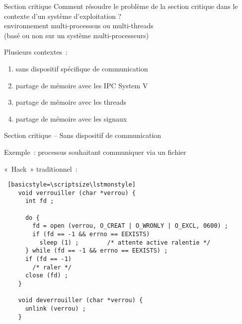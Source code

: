 

\begin {frame} {Section critique}
    Comment résoudre le problème de la section critique dans
    le contexte d'un système d'exploitation ? \\
    \implique environnement multi-processsus ou multi-threads \\
    (basé ou non sur un système multi-processeurs)

    \vspace* {3mm}
    Plusieurs contextes~:
    \begin {enumerate}
	\item sans dispositif spécifique de communication
	\item partage de mémoire avec les IPC System V
	\item partage de mémoire avec les threads
	\item partage de mémoire avec les signaux
    \end {enumerate}

\end {frame}

\begin {frame} [fragile] {Section critique -- Sans dispositif de communication}

    Exemple~: processus souhaitant communiquer via un fichier

    \vspace* {3mm}

    «~Hack~» traditionnel~:

    \begin {lstlisting} [basicstyle=\scriptsize\lstmonstyle]
    void verrouiller (char *verrou) {
      int fd ;

      do {
        fd = open (verrou, O_CREAT | O_WRONLY | O_EXCL, 0600) ;
        if (fd == -1 && errno == EEXISTS)
          sleep (1) ;        /* attente active ralentie */
      } while (fd == -1 && errno == EEXISTS) ;
      if (fd == -1)
        /* raler */
      close (fd) ;
    }

    void deverrouiller (char *verrou) {
      unlink (verrou) ;
    }
    \end{lstlisting}

\end{frame}

